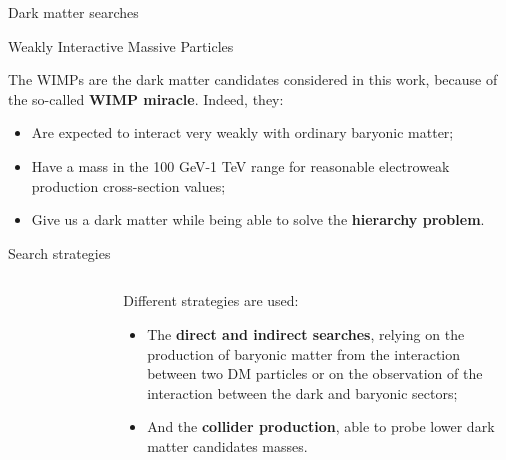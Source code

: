 \documentclass[8pt]{beamer}
\begin{document}
\begin{frame}{Dark matter searches}
\justifying

\vspace{5pt}
\begin{block}{ \centering Weakly Interactive Massive Particles}\end{block} \vfill
The WIMPs are the dark matter candidates considered in this work, because of the so-called \textbf{WIMP miracle}. Indeed, they:

\begin{itemize}
\justifying
\item Are expected to interact very weakly with ordinary baryonic matter;
\item Have a mass in the 100 GeV-1 TeV range for reasonable electroweak production cross-section values;
\item Give us a dark matter while being able to solve the \textbf{hierarchy problem}.
\end{itemize} \vfill

\vspace{5pt}
\begin{block}{ \centering Search strategies}\end{block} \vfill

\begin{columns}
	\begin{column}{0.45\textwidth}
\begin{figure}[htbp]
\begin{center}
\begin{figure}[htbp]
\begin{center}
\includegraphics[width=4.2cm, height=3.5cm]{figs/ThreeWays.png}
\end{center}
\end{figure}
\end{center}
\end{figure}
\end{column}
\begin{column}{0.54\textwidth}
Different strategies are used:

\begin{itemize}
\justifying
\item The \textbf{direct and indirect searches}, relying on the production of baryonic
matter from the interaction between two DM particles or on the observation of the interaction
between the dark and baryonic sectors;
\item And the \textbf{collider production}, able to probe lower dark matter candidates masses.
\end{itemize}

\end{column}
\end{columns} \vfill
\end{frame}
\end{document}
